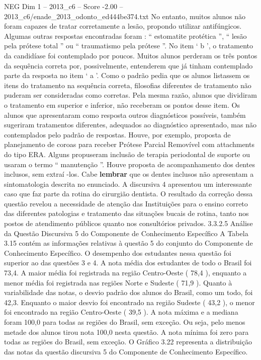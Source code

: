\begin{textsample}{NEG Dim 1 – 2013\_c6 – Score -2.00 – 2013\_c6/enade\_2013\_odonto\_ed444be374.txt}
No entanto, muitos alunos não foram capazes de tratar corretamente a lesão, propondo utilizar antifúngicos.
Algumas outras respostas encontradas foram : “ estomatite protética ”, “ lesão pela prótese total ” ou “ traumatismo pela prótese ”.
No item ‘ b ’, o tratamento da candidíase foi contemplado por poucos.
Muitos alunos perderam os três pontos da sequência correta por, possivelmente, entenderem que já tinham contemplado parte da resposta no item ‘ a ’.
Como o padrão pedia que os alunos listassem os itens do tratamento na sequência correta, filosofias diferentes de tratamento não puderam ser consideradas como corretas.
Pela mesma razão, alunos que dividiram o tratamento em superior e inferior, não receberam os pontos desse item.
Os alunos que apresentaram como resposta outros diagnósticos possíveis, também sugeriram tratamentos diferentes, adequados ao diagnóstico apresentado, mas não contemplados pelo padrão de respostas.
Houve, por exemplo, proposta de planejamento de coroas para receber Prótese Parcial Removível com attachments do tipo ERA.
Alguns propuseram inclusão de terapia periodontal de suporte ou usaram o termo “ manutenção ”.
Houve proposta de acompanhamento dos dentes inclusos, sem extraí -los.
Cabe \textbf{lembrar} que os dentes inclusos não apresentam a sintomatologia descrita no enunciado.
A discursiva 4 apresentou um interessante caso que faz parte da rotina do cirurgião dentista.
O resultado da correção dessa questão revelou a necessidade de atenção das Instituições para o ensino correto das diferentes patologias e tratamento das situações bucais de rotina, tanto nos postos de atendimento públicos quanto nos consultórios privados. 3.3.2.5 Análise da Questão Discursiva 5 do Componente de Conhecimento Específico A Tabela 3.15 contém as informações relativas à questão 5 do conjunto do Componente de Conhecimento Específico.
O desempenho dos estudantes nessa questão foi superior ao das questões 3 e 4.
A nota média dos estudantes de todo o Brasil foi 73,4.
A maior média foi registrada na região Centro-Oeste ( 78,4 ), enquanto a menor média foi registrada nas regiões Norte e Sudeste ( 71,9 ).
Quanto à variabilidade das notas, o desvio padrão dos alunos do Brasil, como um todo, foi 42,3.
Enquanto o maior desvio foi encontrado na região Sudeste ( 43,2 ), o menor foi encontrado na região Centro-Oeste ( 39,5 ).
A nota máxima e a mediana foram 100,0 para todas as regiões do Brasil, sem exceção.
Ou seja, pelo menos metade dos alunos tirou nota 100,0 nesta questão.
A nota mínima foi zero para todas as regiões do Brasil, sem exceção.
O Gráfico 3.22 representa a distribuição das notas da questão discursiva 5 do Componente de Conhecimento Específico.

\end{textsample}
